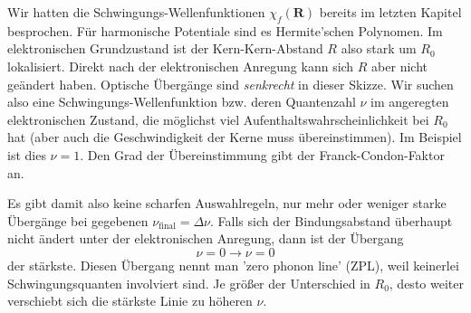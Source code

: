 \begin{marginfigure}
\caption{Die Absorption eines Photons führt zur Anregung der Kern--Kern--Schwingung, wenn die Potentiale gegeneinander verschoben sind.}
\end{marginfigure}

Wir hatten die Schwingungs-Wellenfunktionen $\chi_f(\mathbf{R})$ bereits im letzten Kapitel  besprochen. Für harmonische Potentiale sind es Hermite'schen Polynomen. Im elektronischen Grundzustand ist der Kern-Kern-Abstand $R$ also stark um $R_0$ lokalisiert. Direkt nach der elektronischen Anregung kann sich $R$ aber nicht geändert haben. Optische Übergänge sind \emph{senkrecht} in dieser Skizze. Wir suchen also eine Schwingungs-Wellenfunktion bzw. deren Quantenzahl $\nu$ im angeregten elektronischen Zustand, die möglichst viel Aufenthaltswahrscheinlichkeit bei $R_0$ hat (aber auch die Geschwindigkeit der Kerne muss übereinstimmen). Im Beispiel ist dies $\nu = 1$. Den Grad der Übereinstimmung gibt der Franck-Condon-Faktor an.

Es gibt damit also keine scharfen Auswahlregeln, nur mehr oder weniger starke Übergänge bei gegebenen $\nu_\text{final}  = \Delta \nu$. Falls sich der Bindungsabstand überhaupt nicht ändert unter der elektronischen Anregung, dann ist der Übergang
\begin{equation}
 \nu = 0 \rightarrow \nu = 0
\end{equation}
der stärkste. Diesen Übergang nennt man 'zero phonon line' (ZPL), weil keinerlei Schwingungsquanten involviert sind. Je größer der Unterschied in $R_0$, desto weiter verschiebt sich die stärkste Linie zu höheren $\nu$. 





